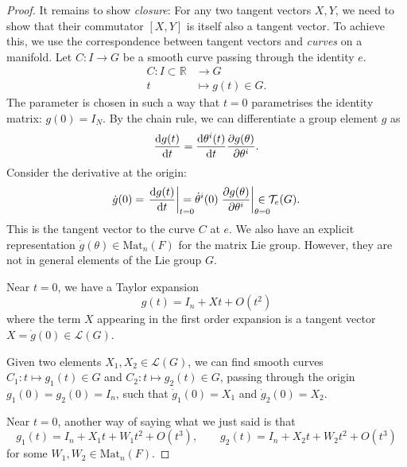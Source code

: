 \begin{proof}
  It remains to show \emph{closure}: For any two tangent vectors $X, Y$, we need to show that their commutator $[X, Y]$ is itself also a tangent vector.
  To achieve this, we use the correspondence between tangent vectors and \emph{curves} on a manifold.
  Let $C: I \to G$ be a smooth curve passing through the identity $e$.
  \begin{equation}
    \begin{split}
      C \colon I \subset \mathbb{R} &\to G \\
      t &\mapsto g(t) \in G.
    \end{split}
  \end{equation}
  The parameter is chosen in such a way that $t=0$ parametrises the identity matrix: $g(0) = I_N$.
  By the chain rule, we can differentiate a group element $g$ as
  \begin{equation}
    \dv{g(t)}{t} = \dv{\theta^i (t)}{t} \pdv{g(\theta)}{\theta^i}.
  \end{equation}
  Consider the derivative at the origin:
  \begin{equation}
    \dot g(0) = \left. \dv{g(t)}{t}\right\rvert_{\mathrlap{t=0}} = \dot \theta^i(0) \left.\pdv{g(\theta)}{\theta^i}\right\rvert_{\mathrlap{\theta = 0}} \in \mathcal{T}_e (G).
  \end{equation}
  This is the tangent vector to the curve $C$ at $e$.
  We also have an explicit representation $\dot g(\theta) \in \text{Mat}_n (F)$ for the matrix Lie group. However, they are not in general elements of the Lie group $G$.

  Near $t = 0$, we have a Taylor expansion
  \begin{equation}
    g(t) = I_n + X t + O(t^2)
  \end{equation}
  where the term $X$ appearing in the first order expansion is a tangent vector $X = \dot g(0) \in \mathscr{L}(G)$.

  Given two elements $X_1, X_2 \in \mathscr{L}(G)$, we can find smooth curves $C_1: t \mapsto g_1(t) \in G$ and $C_2: t \mapsto g_2(t) \in G$, passing through the origin $g_1(0) = g_2(0) = I_n$, such that $\dot g_1(0) = X_1$ and $\dot g_2(0) = X_2$.

  Near $t = 0$, another way of saying what we just said is that
  \begin{equation}
    g_1(t) = I_n + X_1 t + W_1 t^2 + O(t^3), \qquad
    g_2(t) = I_n + X_2 t + W_2 t^2 + O(t^3)
  \end{equation}
  for some $W_1, W_2 \in \text{Mat}_n (F)$.


\end{proof}
